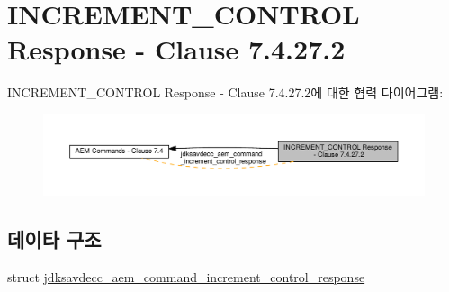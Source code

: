 \hypertarget{group__command__increment__control__response}{}\section{I\+N\+C\+R\+E\+M\+E\+N\+T\+\_\+\+C\+O\+N\+T\+R\+OL Response -\/ Clause 7.4.27.2}
\label{group__command__increment__control__response}
I\+N\+C\+R\+E\+M\+E\+N\+T\+\_\+\+C\+O\+N\+T\+R\+OL Response -\/ Clause 7.4.27.2에 대한 협력 다이어그램\+:
\nopagebreak
\begin{figure}[H]
\begin{center}
\leavevmode
\includegraphics[width=350pt]{group__command__increment__control__response}
\end{center}
\end{figure}
\subsection*{데이타 구조}
\begin{DoxyCompactItemize}
\item 
struct \hyperlink{structjdksavdecc__aem__command__increment__control__response}{jdksavdecc\+\_\+aem\+\_\+command\+\_\+increment\+\_\+control\+\_\+response}
\end{DoxyCompactItemize}
